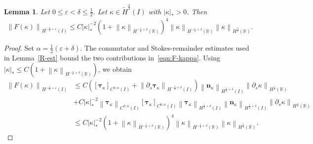 \documentclass[11pt,reqno]{amsart}
\theoremstyle{plain}
\newtheorem{lemma}[theorem]{Lemma}
\theoremstyle{definition}
\numberwithin{equation}{section}
\newcommand{\paren}[1]{\left(#1\right)}
\newcommand{\p}{\partial}
\newcommand{\wt}[1]{\widetilde{#1}}
\newcommand{\bm}[1]{\boldsymbol{#1}}
\newcommand{\abs}[1]{\left\lvert #1 \right\rvert}
\newcommand{\norm}[1]{\left\lVert #1 \right\rVert}
\newcommand{\R}{\mathbb{R}}
\newcommand{\tk}{\bm\tau_\kappa}
\newcommand{\nk}{\bm n_\kappa}
\newcommand{\ci}[1]{C^{#1}(I)}
\newcommand{\hi}[1]{H^{#1}(I)}
\newcommand{\thi}[1]{\wt H^{#1}(I)}
\newcommand{\hr}[1]{H^{#1}(\R)}
\begin{document}
\begin{lemma}\label{F-est}
Let $0\le\varepsilon<\delta\le\frac12$.
Let $\kappa\in\thi{\frac{3}{2}}$ with $\abs{\kappa}_*>0$. Then
\begin{equation}\label{eqn:forcing-bound}
\begin{aligned}
    \norm{F(\kappa)}_{\hi{-\frac{1}{2}+\varepsilon}} \le C \abs{\kappa}_*^{-2}\paren{1+\norm{\kappa}_{\hr{-\frac{1}{2}+\delta}}}^4\norm{\kappa}_{\hr{-\frac{1}{2}+\delta}}\norm{\kappa}_{\hr{\frac{3}{2}}}.
\end{aligned}
\end{equation}

\end{lemma}
\begin{proof}
Set $\alpha=\frac12(\varepsilon+\delta)$.
The commutator and Stokes-remainder estimates used in
Lemma~\ref{R-est} bound the two contributions in~\eqref{eqn:F-kappa}. Using
$\abs{\kappa}_*\le
C\paren{1+\norm{\kappa}_{\hr{-\frac{1}{2}+\delta}}}$, we obtain
\begin{equation}
\begin{aligned}
    \norm{F(\kappa)}_{\hi{-\frac{1}{2}+\varepsilon}} &\le C\paren{[\tk]_{\ci{0,\alpha}}+\norm{\p_s\tk}_{\hi{-\frac{1}{2}+\delta}}}\norm{\nk}_{\hi{\frac{1}{2}+\delta}}\norm{\p_s\kappa}_{\hr{\frac{1}{2}}} \\
    & + C\abs{\kappa}_*^{-2}\norm{\tk}_{\ci{0,\alpha}}[\tk]_{\ci{0,\alpha}}\norm{\tk}_{\hi{\frac{1}{2}+\delta}}\norm{\nk}_{\hi{\frac{1}{2}+\delta}}\norm{\p_s\kappa}_{\hr{\frac{1}{2}}} \\
    & \le C\abs{\kappa}_*^{-2}\paren{1+\norm{\kappa}_{\hr{-\frac{1}{2}+\delta}}}^4\norm{\kappa}_{\hr{-\frac{1}{2}+\delta}}\norm{\kappa}_{\hr{\frac{3}{2}}}.
\end{aligned}
\end{equation}
\end{proof}
\end{document}
